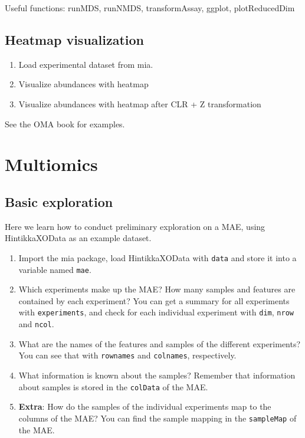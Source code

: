 \documentclass[
]{book}
\providecommand{\tightlist}{%
  \setlength{\itemsep}{0pt}\setlength{\parskip}{0pt}}
\begin{document}
Useful functions: runMDS, runNMDS, transformAssay, ggplot, plotReducedDim

\hypertarget{heatmap-visualization}{%
\subsection{Heatmap visualization}\label{heatmap-visualization}}

\begin{enumerate}
\def\labelenumi{\arabic{enumi}.}
\tightlist
\item
  Load experimental dataset from mia.
\item
  Visualize abundances with heatmap
\item
  Visualize abundances with heatmap after CLR + Z transformation
\end{enumerate}

See the OMA book for examples.

\hypertarget{multiomics}{%
\section{Multiomics}\label{multiomics}}

\hypertarget{basic-exploration}{%
\subsection{Basic exploration}\label{basic-exploration}}

Here we learn how to conduct preliminary exploration on a MAE, using
HintikkaXOData as an example dataset.

\begin{enumerate}
\def\labelenumi{\arabic{enumi}.}
\tightlist
\item
  Import the mia package, load HintikkaXOData with \texttt{data} and store it into a
  variable named \texttt{mae}.
\item
  Which experiments make up the MAE? How many samples and features are contained
  by each experiment? You can get a summary for all experiments with \texttt{experiments},
  and check for each individual experiment with \texttt{dim}, \texttt{nrow} and \texttt{ncol}.
\item
  What are the names of the features and samples of the different experiments?
  You can see that with \texttt{rownames} and \texttt{colnames}, respectively.
\item
  What information is known about the samples? Remember that information about
  samples is stored in the \texttt{colData} of the MAE.
\item
  \textbf{Extra}: How do the samples of the individual experiments map to the
  columns of the MAE? You can find the sample mapping in the \texttt{sampleMap}
  of the MAE.
\end{enumerate}
\end{document}
